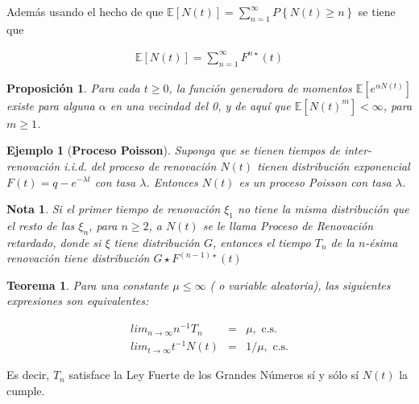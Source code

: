 \documentclass{article}
\newtheorem{Ejem}{Ejemplo}[section]
\newtheorem{Teo}{Teorema}[section]
\newtheorem{Note}{Nota}[section]
\newtheorem{Prop}{Proposición}[section]
\newcommand{\esp}{\mathbb{E}}
\numberwithin{equation}{section}
\begin{document}
Adem\'as usando el hecho de que $\esp\left[N\left(t\right)\right]=\sum_{n=1}^{\infty}P\left\{N\left(t\right)\geq n\right\}$ se tiene que

\begin{eqnarray*}
\esp\left[N\left(t\right)\right]=\sum_{n=1}^{\infty}F^{n\star}\left(t\right)
\end{eqnarray*}

\begin{Prop}
Para cada $t\geq0$, la funci\'on generadora de momentos $\esp\left[e^{\alpha N\left(t\right)}\right]$ existe para alguna $\alpha$ en una vecindad del 0, y de aqu\'i que $\esp\left[N\left(t\right)^{m}\right]<\infty$, para $m\geq1$.
\end{Prop}

\begin{Ejem}[\textbf{Proceso Poisson}]
Suponga que se tienen tiempos de inter-renovaci\'on \textit{i.i.d.} del proceso de renovaci\'on $N\left(t\right)$ tienen distribuci\'on exponencial $F\left(t\right)=q-e^{-\lambda t}$ con tasa $\lambda$. Entonces $N\left(t\right)$ es un proceso Poisson con tasa $\lambda$.

\end{Ejem}



\begin{Note}
Si el primer tiempo de renovaci\'on $\xi_{1}$ no tiene la misma distribuci\'on que el resto de las $\xi_{n}$, para $n\geq2$, a $N\left(t\right)$ se le llama Proceso de Renovaci\'on retardado, donde si $\xi$ tiene distribuci\'on $G$, entonces el tiempo $T_{n}$ de la $n$-\'esima renovaci\'on tiene distribuci\'on $G\star F^{\left(n-1\right)\star}\left(t\right)$
\end{Note}


\begin{Teo}
Para una constante $\mu\leq\infty$ ( o variable aleatoria), las siguientes expresiones son equivalentes:

\begin{eqnarray}
lim_{n\rightarrow\infty}n^{-1}T_{n}&=&\mu,\textrm{ c.s.}\\
lim_{t\rightarrow\infty}t^{-1}N\left(t\right)&=&1/\mu,\textrm{ c.s.}
\end{eqnarray}
\end{Teo}

Es decir, $T_{n}$ satisface la Ley Fuerte de los Grandes N\'umeros s\'i y s\'olo s\'i $N\left(t\right)$ la cumple.
\end{document}
